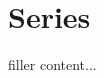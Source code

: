 \documentclass[../../templates/section]{subfiles}
\begin{document}
\section{Series}\label{sec:series}

filler content...
\end{document}
